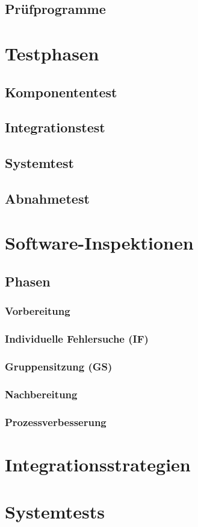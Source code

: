 \documentclass[a4paper]{article}
\theoremstyle{break}
\begin{document}
\subsection{Prüfprogramme}
\section{Testphasen}
\subsection{Komponententest}
\subsection{Integrationstest}
\subsection{Systemtest}
\subsection{Abnahmetest}
\section{Software-Inspektionen}
\subsection{Phasen}
\subsubsection{Vorbereitung}
\subsubsection{Individuelle Fehlersuche (IF)}
\subsubsection{Gruppensitzung (GS)}
\subsubsection{Nachbereitung}
\subsubsection{Prozessverbesserung}
\section{Integrationsstrategien}
\section{Systemtests}
\end{document}
